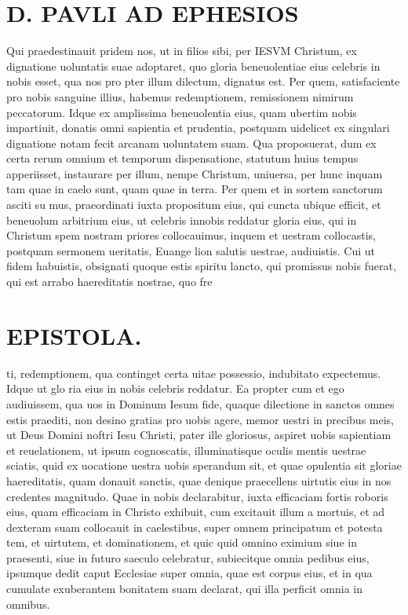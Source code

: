 \documentclass{article}
\begin{document}
\begin{pages}
\section*{D. PAVLI AD EPHESIOS }
\marginpar{[ p.3.  ]}
\marginpar{[ p.4.  ]}
\marginpar{[ p.5.  ]}
\marginpar{[ p.6.  ]}
\marginpar{[ p.7.  ]}\pstart Qui praedestinauit pridem nos, ut in filios sibi, per IESVM Christum, ex dignatione uoluntatis suae adoptaret, quo gloria beneuolentiae eius celebris in nobis esset, qua nos pro pter illum dilectum, dignatus est.  \pend\pstart Per  quem, satisfaciente pro nobis sanguine illius, habemus redemptionem, remissionem nimirum peccatorum.  Idque  ex amplissima beneuolentia eius, quam ubertim nobis impartiuit, donatis omni sapientia et prudentia, postquam uidelicet ex singulari dignatione notam fecit arcanam uoluntatem suam.  \pend\pstart Qua proposuerat, dum ex certa rerum omnium et temporum dispensatione, statutum huius tempus apperiisset, instaurare per illum, nempe Christum, uniuersa, per hunc inquam tam quae in caelo sunt, quam quae in terra.  \pend\pstart Per quem et in sortem sanctorum asciti su mus, praeordinati iuxta propositum eius, qui cuncta ubique efficit, et beneuolum arbitrium eius, ut celebris innobis reddatur gloria eius, qui in Christum spem nostram priores collocauimus, inquem et uestram collocastis, postquam sermonem ueritatis, Euange lion salutis uestrae, audiuistis.  \pend\pstart Cui ut fidem habuistis, obsignati quoque estis spiritu lancto, qui promissus nobis fuerat, qui est arrabo haereditatis nostrae, quo fre  \pend
\section*{EPISTOLA. }
\marginpar{[ p.10 ]}
\marginpar{[ p.8. ]}
\marginpar{[ p.9. ]}\pstart ti, redemptionem, qua continget certa uitae possessio, indubitato expectemus. Idque ut glo ria eius in nobis celebris reddatur.  \pend\pstart Ea propter cum et ego audiuissem, qua uos in Dominum Iesum fide, quaque  dilectione in sanctos omnes estis praediti, non desino gratias pro uobis agere, memor uestri in precibus meis, ut Deus Domini noftri Iesu Christi, pater ille gloriosus, aspiret uobis sapientiam et reuelationem, ut ipsum cognoscatis, illuminatisque  oculis mentis uestrae sciatis, quid ex uocatione uestra uobis sperandum sit, et quae opulentia sit gloriae haereditatis, quam donauit sanctis, quae denique praecellens uirtutis eius in nos credentes magnitudo.  \pend\pstart Quae in nobis declarabitur, iuxta efficaciam fortis roboris eius, quam efficaciam in Christo exhibuit, cum excitauit illum a mortuis, et ad dexteram suam collocauit in caelestibus, super omnem principatum et potesta tem, et uirtutem, et dominationem, et quic quid omnino eximium siue in praesenti, siue in futuro saeculo celebratur, subiecitque  omnia pedibus eius, ipsumque  dedit caput Ecclesiae super omnia, quae est corpus eius, et in qua cumulate exuberantem bonitatem suam declarat, qui illa perficit omnia in omnibus.  \pend

\end{pages}
\end{document}

